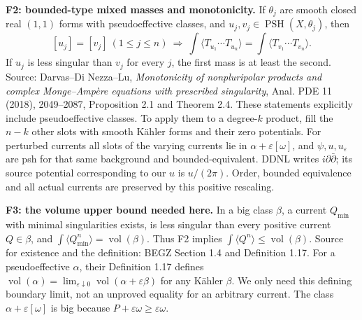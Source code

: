 \documentclass[
  10pt,
]{article}
\begin{document}
\textbf{F2: bounded-type mixed masses and monotonicity.} If \(\theta_j\)
are smooth closed real \((1,1)\) forms with pseudoeffective classes, and
\(u_j,v_j\in\operatorname{PSH}(X,\theta_j)\), then \[
[u_j]=[v_j]\ (1\leq j\leq n)\ \Longrightarrow\
\int\langle T_{u_1}\cdots T_{u_n}\rangle=\int\langle T_{v_1}\cdots T_{v_n}\rangle.
\] If \(u_j\) is less singular than \(v_j\) for every \(j\), the first
mass is at least the second. Source: Darvas--Di Nezza--Lu,
\emph{Monotonicity of nonpluripolar products and complex Monge--Ampère
equations with prescribed singularity}, Anal. PDE 11 (2018), 2049--2087,
Proposition 2.1 and Theorem 2.4. These statements explicitly include
pseudoeffective classes. To apply them to a degree-\(k\) product, fill
the \(n-k\) other slots with smooth Kähler forms and their zero
potentials. For perturbed currents all slots of the varying currents lie
in \(\alpha+\varepsilon[\omega]\), and \(\psi,u,u_\varepsilon\) are psh
for that same background and bounded-equivalent. DDNL writes
\(i\partial\bar\partial\); its source potential corresponding to our
\(u\) is \(u/(2\pi)\). Order, bounded equivalence and all actual
currents are preserved by this positive rescaling.

\textbf{F3: the volume upper bound needed here.} In a big class
\(\beta\), a current \(Q_{\min}\) with minimal singularities exists, is
less singular than every positive current \(Q\in\beta\), and
\(\int\langle Q_{\min}^n\rangle=\operatorname{vol}(\beta)\). Thus F2
implies \(\int\langle Q^n\rangle\leq\operatorname{vol}(\beta)\). Source
for existence and the definition: BEGZ Section 1.4 and Definition 1.17.
For a pseudoeffective \(\alpha\), their Definition 1.17 defines
\(\operatorname{vol}(\alpha)=\lim_{\varepsilon\downarrow0}\operatorname{vol}(\alpha+\varepsilon\beta)\)
for any Kähler \(\beta\). We only need this defining boundary limit, not
an unproved equality for an arbitrary current. The class
\(\alpha+\varepsilon[\omega]\) is big because
\(P+\varepsilon\omega\geq\varepsilon\omega\).
\end{document}

